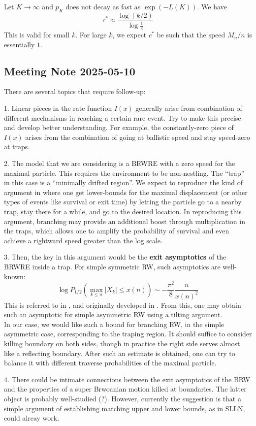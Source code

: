 Let $K \to \infty$ and $p_K$ does not decay as fast as $\exp(-L(K))$. We have
\[
    c^* \approx \frac{\log (k / 2)}{\log{\frac{1}{\kappa}}}
\]
This is valid for small $k$. For large $k$, we expect $c^*$ be such that the speed $M_n / n$ is essentially $1$.



\subsection{Meeting Note 2025-05-10}

There are several topics that require follow-up:

1. Linear pieces in the rate function $I(x)$ generally arise from combination of different mechanisms in reaching a certain rare event. Try to make this precise and develop better understanding. For example, the constantly-zero piece of $I(x)$ arises from the combination of going at ballistic speed and stay speed-zero at traps.

2. The model that we are considering is a BRWRE with a zero speed for the maximal particle. This requires the environment to be non-nestling. The ``trap'' in this case is a ``minimally drifted region''. We expect to reproduce the kind of argument in \autocite{gantertMaximalDisplacement2011} where one get lower-bounds for the maximal displacement (or other types of events like survival or exit time) by letting the particle go to a nearby trap, stay there for a while, and go to the desired location. In reproducing this argument, branching may provide an additional boost through multiplication in the traps, which allows one to amplify the probability of survival and even achieve a rightward speed greater than the log scale.

3. Then, the key in this argument would be the \textbf{exit asymptotics} of the BRWRE inside a trap. For simple symmetric RW, such asymptotics are well-known: 
\[
\log P_{1/2}\left(\max_{k \leq n} |X_k| \leq x(n)\right) \sim - \frac{\pi^2}{8} \frac{n}{x(n)^2}
\]
This is referred to in \autocite[Lemma~3.4]{gantertMaximalDisplacement2011}, and originally developed in \autocite[Proposition~21.5, p.244]{spitzerPrinciplesRandom1964}. From this, one may obtain such an asymptotic for simple asymmetric RW using a tilting argument. 
\\
In our case, we would like such a bound for branching RW, in the simple asymmetric case, corresponding to the traping region. It should suffice to consider killing boundary on both sides, though in practice the right side serves almost like a reflecting boundary. After such an estimate is obtained, one can try to balance it with different traverse probabilities of the maximal particle.

4. There could be intimate connections between the exit asymptotics of the BRW and the properties of a super Brwoanian motion killed at boundaries. The latter object is probably well-studied (?). However, currently the suggestion is that a simple argument of establishing matching upper and lower bounds, as in SLLN, could alreay work.



